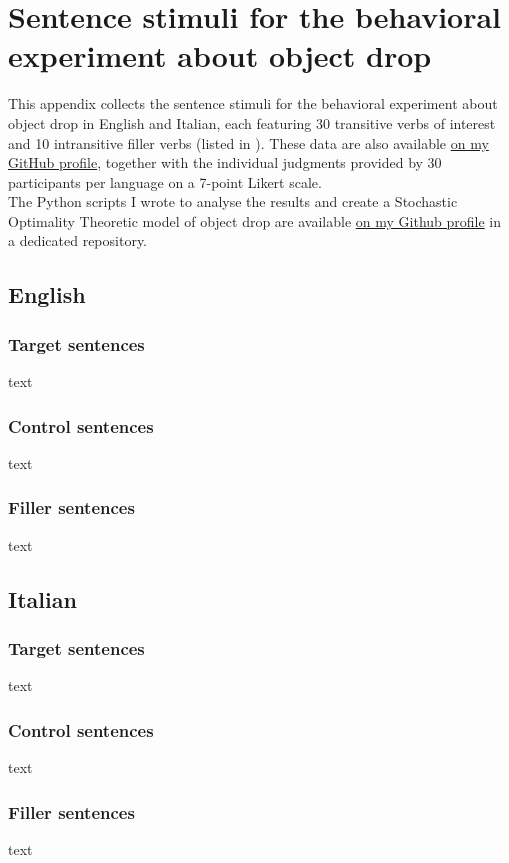 \setchapterpreamble[u]{\margintoc}
\chapter{Sentence stimuli for the behavioral experiment about object drop}

This appendix collects the sentence stimuli for the behavioral experiment about object drop in English and Italian, each featuring 30 transitive verbs of interest and 10 intransitive filler verbs (listed in ). These data are also available \href{https://github.com/giuliacappelli/dissertationData}{on my GitHub profile}, together with the individual judgments provided by 30 participants per language on a 7-point Likert scale.\\
The Python scripts I wrote to analyse the results and create a Stochastic Optimality Theoretic model of object drop are available \href{https://github.com/giuliacappelli/MedinaStochasticOptimalityTheory}{on my Github profile} in a dedicated repository.


\section{English}

\subsection{Target sentences}
text 

\subsection{Control sentences}
text 

\subsection{Filler sentences}
text 


\section{Italian}

\subsection{Target sentences}
text 

\subsection{Control sentences}
text 

\subsection{Filler sentences}
text 
